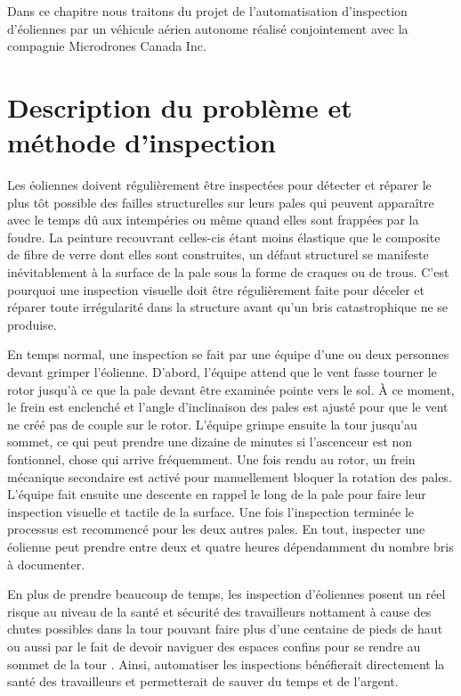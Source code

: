 \label{sec:uav}

Dans ce chapitre nous traitons du projet de l'automatisation d'inspection d'éoliennes par un véhicule aérien autonome réalisé conjointement avec la compagnie Microdrones Canada Inc.

\section{Description du problème et méthode d'inspection}

Les éoliennes doivent régulièrement être inspectées pour détecter et réparer le plus tôt possible des failles structurelles sur leurs pales qui peuvent apparaître avec le temps dû aux intempéries ou même quand elles sont frappées par la foudre. La peinture recouvrant celles-cis étant moins élastique que le composite de fibre de verre dont elles sont construites, un défaut structurel se manifeste inévitablement à la surface de la pale sous la forme de craques ou de trous. C'est pourquoi une inspection visuelle doit être régulièrement faite pour déceler et réparer toute irrégularité dans la structure avant qu'un bris catastrophique ne se produise.

En temps normal, une inspection se fait par une équipe d'une ou deux personnes devant grimper l'éolienne. D'abord, l'équipe attend que le vent fasse tourner le rotor jusqu'à ce que la pale devant être examinée pointe vers le sol. À ce moment, le frein est enclenché et l'angle d'inclinaison des pales est ajusté pour que le vent ne créé pas de couple sur le rotor. L'équipe grimpe ensuite la tour jusqu'au sommet, ce qui peut prendre une dizaine de minutes si l'ascenceur est non fontionnel, chose qui arrive fréquemment. Une fois rendu au rotor, un frein mécanique secondaire est activé pour manuellement bloquer la rotation des pales. L'équipe fait ensuite une descente en rappel le long de la pale pour faire leur inspection visuelle et tactile de la surface. Une fois l'inspection terminée le processus est recommencé pour les deux autres pales. En tout, inspecter une éolienne peut prendre entre deux et quatre heures dépendamment du nombre bris à documenter.

En plus de prendre beaucoup de temps, les inspection d'éoliennes posent un réel risque au niveau de la santé et sécurité des travailleurs nottament à cause des chutes possibles dans la tour pouvant faire plus d'une centaine de pieds de haut ou aussi par le fait de devoir naviguer des espaces confins pour se rendre au sommet de la tour \citep{Osha2017}. Ainsi, automatiser les inspections bénéfierait directement la santé des travailleurs et permetterait de sauver du temps et de l'argent.

